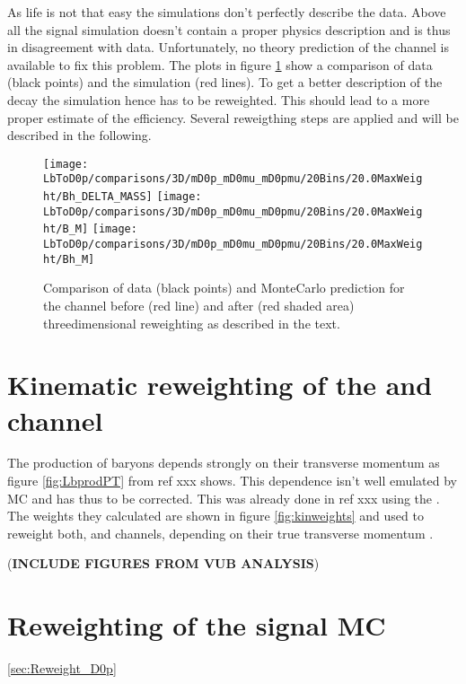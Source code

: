 As life is not that easy the simulations don't perfectly describe the data. 
Above all the \LbToDpmunuX signal simulation doesn't contain a proper physics description and is thus in disagreement with data. 
Unfortunately, no theory prediction of the \LbToDpumnuX channel is available to fix this problem.
The plots in figure \ref{fig:reweighting} show a comparison of data (black points) and the simulation (red lines).
To get a better description of the decay the simulation hence has to be reweighted.
This should lead to a more proper estimate of the efficiency.
Several reweigthing steps are applied and will be described in the following.
\begin{figure}[hptb]
	\centering
	\texttt{[image: LbToD0p/comparisons/3D/mD0p\_mD0mu\_mD0pmu/20Bins/20.0MaxWeight/Bh\_DELTA\_MASS]}
	\texttt{[image: LbToD0p/comparisons/3D/mD0p\_mD0mu\_mD0pmu/20Bins/20.0MaxWeight/B\_M]}
	\texttt{[image: LbToD0p/comparisons/3D/mD0p\_mD0mu\_mD0pmu/20Bins/20.0MaxWeight/Bh\_M]}
	\caption{Comparison of data (black points) and MonteCarlo prediction for the \LbToDpmunuX channel before (red line) and after (red shaded area) threedimensional reweighting as described in the text.}
	\label{fig:reweighting}
\end{figure}

\section{Kinematic reweighting of the \LbToDpmunuX and \LbToLcmunu channel}
The production of \Lb baryons depends strongly on their transverse momentum as figure \ref{fig:LbprodPT} from ref xxx shows. This dependence isn't well emulated by MC and has thus to be corrected. 
This was already done in ref xxx using the \decay{\Lb}{\jpsi\Dz\proton}. The weights they calculated are shown in figure \ref{fig:kinweights} and used to reweight both, \LbToDpmunuX and \LbToLcmunu channels, depending on their true \Lb transverse momentum \pt.

(\textbf{INCLUDE FIGURES FROM VUB ANALYSIS})


\section{Reweighting of the \Dz\proton signal MC}
\ref{sec:Reweight_D0p}

